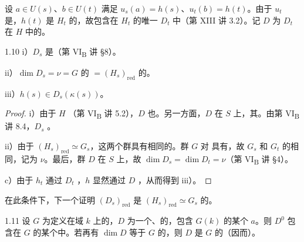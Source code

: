 设 $a\in U(s)$、$b\in U(t)$ 满足 $u_s(a)=h(s)$、$u_t(b)=h(t)$。由于 $u_t$ 是，$h(t)$ 是 $H_t$ 的，故包含在 $H_t$ 的唯一 $D_t$ 中（第 XIII 讲 3.2）。记 $D$ 为 $D_t$ 在 $H$ 中的。
\begin{SGAresult}{}{1.10}
 i）$D_s$ 是（第 VI\textsubscript{B} 讲 §8）。

 ii）$\dim D_s=\nu=G$ 的 $=(H_s)_{\mathrm{red}}$ 的。

 iii）$h(s)\in D_s(\kappa(s))$。
\end{SGAresult}
\begin{proof}
 i）由于 $H$ （第 VI\textsubscript{B} 讲 5.2），$D$ 也。另一方面，$D$ 在 $S$ 上，其。由第 VI\textsubscript{B} 讲 8.4，$D_s$ 。

 ii）由于 $(H_s)_{\mathrm{red}}\simeq G_s$，这两个群具有相同的。群 $G$ 对 具有，故 $G_s$ 和 $G_t$ 的相同，记为 $\nu$。最后，群 $D$ 在 $S$ 上，故 $\dim D_s=\dim D_t=\nu$（第 VI\textsubscript{B} 讲 §4）。

 c）由于 $h_t$ 通过 $D_t$ ，$h$ 显然通过 $D$ ，从而得到 iii）。
\end{proof}
在此条件下，下一个证明 $(D_s)_{\mathrm{red}}$ 是 $(H_s)_{\mathrm{red}}\simeq G_s$ 的。
\begin{SGAresult}{}{1.11}
设 $G$ 为定义在域 $k$ 上的，$D$ 为一个、的，包含 $G(k)$ 的某个 $a$。则 $D^0$ 包含在 $G$ 的某个中。若再有 $\dim D$ 等于 $G$ 的，则 $D$ 是 $G$ 的（因而）。
\end{SGAresult}
